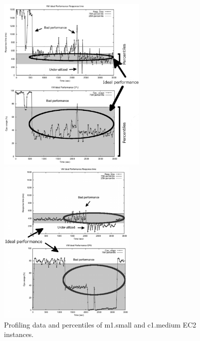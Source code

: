 \begin{enumerate}

\begin{figure}[htb]
	\begin{minipage}[b]{0.45\linewidth}
		\includegraphics[height=8.5cm]{images/idealSmallRemark.pdf}	
		\vspace{-4mm}
	\end{minipage}
	\hfill
	\begin{minipage}[b]{0.45\linewidth}
		\includegraphics[height=8cm]{images/idealc1MediumRemark.pdf}
		\vspace{-4mm}
	\end{minipage}
\caption{Profiling data and percentiles of m1.small and c1.medium EC2 instances.}
\label{fig:vm_performance}
\end{figure}


\end{enumerate}
